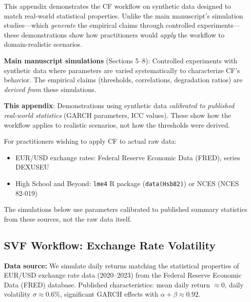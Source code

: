 \documentclass[10pt]{article} %
\theoremstyle{plain}
\theoremstyle{definition}
\begin{document}
This appendix demonstrates the CF workflow on synthetic data designed to match real-world statistical properties. Unlike the main manuscript's simulation studies---which \emph{generate} the empirical claims through controlled experiments---these demonstrations show how practitioners would \emph{apply} the workflow to domain-realistic scenarios.

\begin{tcolorbox}[breakable, colback=blue!5, colframe=blue!50!black, title=\textbf{Relationship to Main Manuscript}, fonttitle=\bfseries]
\textbf{Main manuscript simulations} (Sections 5--8): Controlled experiments with synthetic data where parameters are varied systematically to characterize CF's behavior. The empirical claims (thresholds, correlations, degradation ratios) are \emph{derived from} these simulations.

\textbf{This appendix}: Demonstrations using synthetic data \emph{calibrated to published real-world statistics} (GARCH parameters, ICC values). These show how the workflow applies to realistic scenarios, not how the thresholds were derived.
\end{tcolorbox}

\begin{tcolorbox}[breakable, colback=gray!5, colframe=gray!50!black, title=\textbf{Data Sources for Replication}, fonttitle=\bfseries]
For practitioners wishing to apply CF to actual raw data:
\begin{itemize}
    \item EUR/USD exchange rates: Federal Reserve Economic Data (FRED), series DEXUSEU
    \item High School and Beyond: \texttt{lme4} R package (\texttt{data(Hsb82)}) or NCES (NCES 82-019)
\end{itemize}
The simulations below use parameters calibrated to published summary statistics from these sources, not the raw data itself.
\end{tcolorbox}

\subsection{SVF Workflow: Exchange Rate Volatility}

\textbf{Data source:} We simulate daily returns matching the statistical properties of EUR/USD exchange rate data (2020--2023) from the Federal Reserve Economic Data (FRED) database. Published characteristics: mean daily return $\approx 0$, daily volatility $\sigma \approx 0.6\%$, significant GARCH effects with $\alpha + \beta \approx 0.92$.
\end{document}
